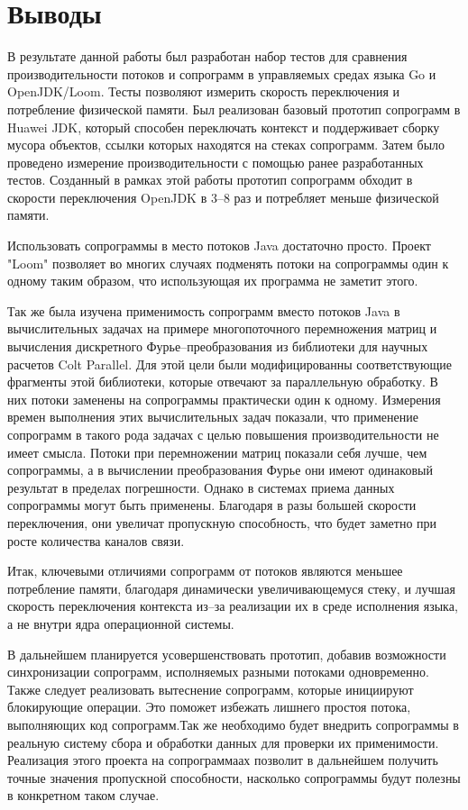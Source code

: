 \section{Выводы}
	В результате данной работы был разработан набор тестов для сравнения производительности потоков и сопрограмм в
	управляемых средах языка Go и OpenJDK/Loom. Тесты позволяют измерить скорость переключения и
	потребление физической памяти. Был реализован базовый прототип сопрограмм в
	Huawei JDK, который способен переключать контекст и поддерживает сборку мусора объектов, ссылки которых находятся
	на стеках сопрограмм. Затем было проведено измерение производительности с помощью ранее разработанных тестов.
	Созданный в рамках этой работы прототип сопрограмм обходит в скорости переключения
	OpenJDK в 3--8 раз и потребляет меньше физической памяти.
	\par
	Использовать сопрограммы в место потоков Java достаточно просто. Проект "Loom"
	позволяет во многих случаях подменять потоки на сопрограммы один к одному таким образом,
	что использующая их программа не заметит этого.
	\par
	Так же была изучена применимость сопрограмм вместо потоков Java в вычислительных задачах на
	примере многопоточного перемножения матриц и вычисления дискретного Фурье--преобразования 
	из библиотеки для научных расчетов Colt Parallel. Для этой цели были модифицированны соответствующие 
	фрагменты этой библиотеки, которые отвечают за параллельную обработку. В них потоки заменены 
	на сопрограммы практически один к одному.
	Измерения времен выполнения этих вычислительных задач показали, что применение сопрограмм в 
	такого рода задачах с целью повышения производительности не имеет смысла. Потоки при 
	перемножении матриц показали себя лучше,
	чем сопрограммы, а в вычислении преобразования Фурье они имеют одинаковый результат в пределах погрешности.
	Однако в системах приема данных сопрограммы могут быть применены. Благодаря в разы большей скорости
	переключения, они увеличат пропускную способность, что будет заметно при росте количества каналов связи.
	\par
	Итак, ключевыми отличиями сопрограмм от потоков являются меньшее потребление памяти, благодаря
	динамически увеличивающемуся стеку, и лучшая скорость переключения контекста из--за реализации 
	их в среде исполнения языка, а не внутри ядра операционной системы.
	\par
	В дальнейшем планируется усовершенствовать прототип, добавив возможности синхронизации
	сопрограмм, исполняемых разными потоками одновременно. Также следует реализовать вытеснение сопрограмм, которые
	инициируют блокирующие операции. Это поможет избежать лишнего простоя потока, выполняющих код сопрограмм.Так же
	необходимо будет внедрить сопрограммы в реальную систему сбора и обработки данных для проверки их 
	применимости. Реализация этого проекта на сопрограммаах позволит в дальнейшем получить точные значения
	пропускной способности, насколько сопрограммы будут полезны в конкретном таком случае.  
\clearpage
